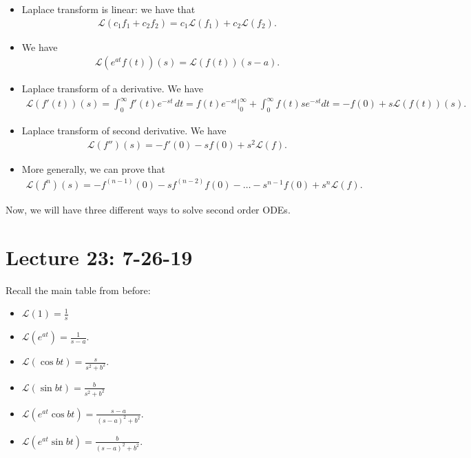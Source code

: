 \documentclass{article}
\newcommand{\LL}{\mathcal{L}}
\begin{document}
\begin{itemize}
  \item Laplace transform is linear: we have that
    \begin{align*}
      \LL (c_1 f_1 + c_2 f_2) = c_1 \LL (f_1) + c_2 \LL (f_2).
    \end{align*}
  \item We have
    \begin{align*}
      \LL (e^{at} f(t)) (s) = \LL (f(t)) (s-a).
    \end{align*}
  \item Laplace transform of a derivative.  We have
    \begin{align*}
      \LL (f'(t)) (s) = \int_{0}^{\infty} f'(t) e^{-st} \, dt = \left . f(t) e^{-st} |_{0}^{\infty} + \int_{0}^{\infty} f(t) s e^{-st} dt = - f(0) + s \LL \left( f(t) \right) (s).
    \end{align*}
  \item Laplace transform of second derivative.  We have
    \begin{align*}
      \LL (f'')(s) = - f'(0) - s f(0) + s^2 \LL (f).
    \end{align*}
  \item More generally, we can prove that
    \begin{align*}
      \LL \left( f^{n} \right)(s) = - f^{(n-1)}(0) - s f^{(n-2)} f(0) - \dots - s^{n-1} f(0) + s^n \LL (f).
    \end{align*}
\end{itemize}

Now, we will have three different ways to solve second order ODEs.

\section{Lecture 23: 7-26-19}

Recall the main table from before:

\begin{itemize}
  \item $\LL(1) = \frac{1}{s}$
  \item $\LL(e^{at}) = \frac{1}{s-a}$.
  \item $\LL (\cos bt) = \frac{s}{s^2 + b^2}$.
  \item $\LL (\sin bt) = \frac{b}{s^2 + b^2}$
  \item $\LL (e^{at} \cos bt) = \frac{s-a}{(s-a)^2 + b^2}$.
  \item $\LL (e^{at} \sin bt) = \frac{b}{(s-a)^2 + b^2}$.
\end{itemize}
\end{document}
